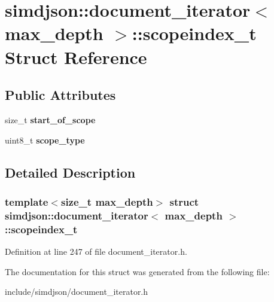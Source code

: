 \hypertarget{structsimdjson_1_1document__iterator_1_1scopeindex__t}{}\section{simdjson\+:\+:document\+\_\+iterator$<$ max\+\_\+depth $>$\+:\+:scopeindex\+\_\+t Struct Reference}
\label{structsimdjson_1_1document__iterator_1_1scopeindex__t}
\subsection*{Public Attributes}
\begin{DoxyCompactItemize}
\item 
\mbox{\label{structsimdjson_1_1document__iterator_1_1scopeindex__t_aa94176b73304d543316b1ba63ed22b33}} 
size\+\_\+t {\bfseries start\+\_\+of\+\_\+scope}
\item 
\mbox{\label{structsimdjson_1_1document__iterator_1_1scopeindex__t_a09fb4c9624e5b1313c00a113ca9fcb19}} 
uint8\+\_\+t {\bfseries scope\+\_\+type}
\end{DoxyCompactItemize}


\subsection{Detailed Description}
\subsubsection*{template$<$size\+\_\+t max\+\_\+depth$>$\newline
struct simdjson\+::document\+\_\+iterator$<$ max\+\_\+depth $>$\+::scopeindex\+\_\+t}



Definition at line 247 of file document\+\_\+iterator.\+h.



The documentation for this struct was generated from the following file\+:\begin{DoxyCompactItemize}
\item 
include/simdjson/document\+\_\+iterator.\+h\end{DoxyCompactItemize}
